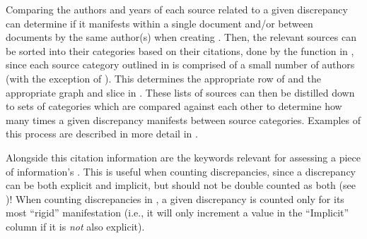 Comparing the authors and years of each source related to a given discrepancy
can determine if it manifests within a single document and/or between documents
by the same author(s) when creating . Then, the
relevant sources can be sorted into their categories based on their citations,
done by the function in , since each source category
outlined in  is comprised of a small number of authors (with the
exception of \papers{}).
This determines the appropriate row of  and the appropriate
graph and slice in . These lists of sources can then
be distilled down to sets of categories which are compared against
each other to determine how many times a given discrepancy manifests between
source categories. Examples of this process are described in more detail in
.

\label{auto-discrep-analysis-rigidity}
Alongside this citation information are the keywords relevant for assessing a
piece of information's . This is useful when counting
discrepancies, since a discrepancy can be both explicit and implicit, but
should not be double counted as both (see )! When counting
discrepancies in , a given discrepancy is counted only for
its most ``rigid'' manifestation (i.e., it will only increment a value in the
``Implicit'' column if it is \emph{not} also explicit).

